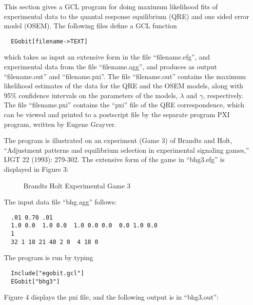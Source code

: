 This section gives a GCL program for doing maximum likelihood fits of
experimental data to the quantal response equilibrium (QRE) and one
sided error model (OSEM).  The following files define a GCL function 

\protect \large \begin{verbatim}
  EGobit[filename->TEXT] 
\end{verbatim} \normalsize

\noindent
which takes as input an extensive form in the file ``filename.efg'',
and experimental data from the file ``filename.agg'', and produces as
output ``filename.out'' and ``filename.pxi''.  The file
``filename.out'' contains the maximum likelihood estimates of the data
for the QRE and the OSEM models, along with 95\% confidence intervals
on the parameters of the models, $\lambda$ and $\gamma$, respectively.
The file ``filename.pxi'' contains the ``pxi'' file of the QRE
correspondence, which can be viewed and printed to a postscript file
by the separate program PXI program, written by Eugene Grayver.  

The program is illustrated on an experiment (Game 3) of Brandts and
Holt, ``Adjustment patterns and equilibrium selection in experimental
signaling games,'' IJGT 22 (1993): 279-302.  The extensive form of the
game in ``bhg3.efg'' is displayed in Figure 3:

\begin{figure}[htp]
\centerline{}
\caption{Brandts Holt Experimental Game 3}
\end{figure}

\noindent
The input data file ``bhg.agg'' follows:

\begin{verbatim}
  .01 0.70 .01
  1.0 0.0  1.0 0.0  1.0 0.0 0.0  0.0 1.0 0.0 
  1
  32 1 18 21 48 2 0  4 18 0
\end{verbatim}
\noindent
The program is run by typing 

\begin{verbatim}
  Include["egobit.gcl"]
  EGobit["bhg3"]
\end{verbatim}

\noindent
Figure 4 displays the pxi file, and the following output is in
``bhg3.out'':

